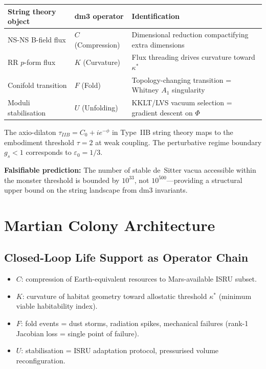 \documentclass[11pt, twoside, openright]{book}
\theoremstyle{plain}
\theoremstyle{definition}
\newcommand{\eps}{\varepsilon_0}
\begin{document}
\begin{tabularx}{\textwidth}{@{}P{3cm}P{3cm}L@{}}
\toprule
\textbf{String theory object} & \textbf{dm3 operator} &
\textbf{Identification} \\
\midrule
NS-NS B-field flux   & $C$ (Compression)      &
  Dimensional reduction compactifying extra dimensions \\
RR $p$-form flux     & $K$ (Curvature)        &
  Flux threading drives curvature toward $\kappa^*$ \\
Conifold transition  & $F$ (Fold)             &
  Topology-changing transition = Whitney $A_1$ singularity \\
Moduli stabilisation & $U$ (Unfolding)        &
  KKLT/LVS vacuum selection = gradient descent on $\Phi$ \\
\bottomrule
\end{tabularx}

\medskip
The axio-dilaton $\tau_{IIB} = C_0 + ie^{-\phi}$ in Type~IIB string
theory maps to the embodiment threshold $\tau = 2$ at weak coupling.
The perturbative regime boundary $g_s < 1$ corresponds to $\eps = 1/3$.

\textbf{Falsifiable prediction:} The number of stable de~Sitter vacua
accessible within the monster threshold is bounded by $10^{33}$, not
$10^{500}$---providing a structural upper bound on the string landscape
from dm3 invariants.

\chapter{Martian Colony Architecture}

\section{Closed-Loop Life Support as Operator Chain}

\begin{itemize}[leftmargin=*]
  \item $C$: compression of Earth-equivalent resources to Mars-available
    ISRU subset.
  \item $K$: curvature of habitat geometry toward allostatic threshold
    $\kappa^*$ (minimum viable habitability index).
  \item $F$: fold events = dust storms, radiation spikes, mechanical
    failures (rank-1 Jacobian loss = single point of failure).
  \item $U$: stabilisation = ISRU adaptation protocol, pressurised
    volume reconfiguration.
\end{itemize}
\end{document}
